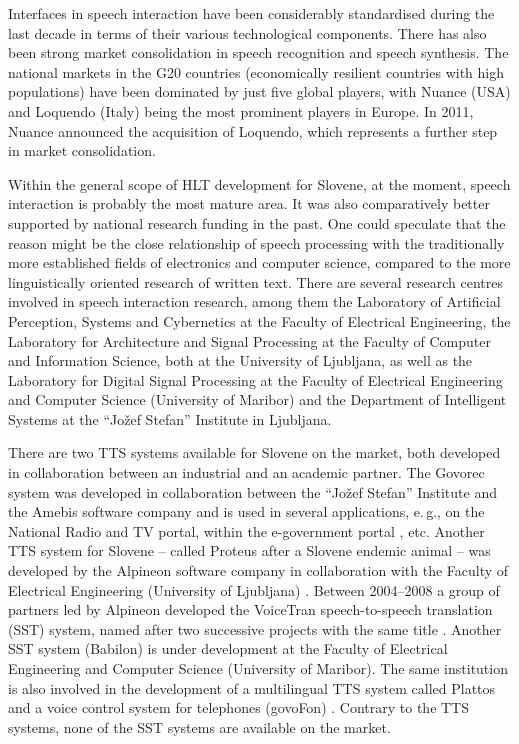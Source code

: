 \begin{multicols}{2}
Interfaces in speech interaction have been considerably standardised during the last decade in terms of their various technological components. There has also been strong market consolidation in speech recognition and speech synthesis. The national markets in the G20 countries (economically resilient countries with high populations) have been dominated by just five global players, with Nuance (USA) and Loquendo (Italy) being the most prominent players in Europe. In 2011, Nuance announced the acquisition of Loquendo, which represents a further step in market consolidation.

Within the general scope of HLT development for Slovene, at the moment, speech interaction is probably the most mature area. It was also comparatively better supported by national research funding in the past. One could speculate that the reason might be the close relationship of speech processing with the traditionally more established fields of electronics and computer science, compared to the more linguistically oriented research of written text. There are several research centres involved in speech interaction research, among them the Laboratory of Artificial Perception, Systems and Cybernetics at the Faculty of Electrical Engineering, the Laboratory for Architecture and Signal Processing at the Faculty of Computer and Information Science, both at the University of Ljub\-ljana, as well as the Laboratory for Digital Signal Processing at the Faculty of Electrical Engineering and Computer Science (University of Maribor) and the Department of Intelligent Systems at the “Jožef Stefan” Institute in Ljub\-ljana. 

There are two TTS systems available for Slovene on the market, both developed in collaboration between an industrial and an academic partner. The Govorec system was developed in collaboration between the “Jožef Stefan” Institute and the Amebis software company and is used in several applications, e.\,g., on the National Radio and TV portal, within the e-government portal \cite{Amb3}, etc.   Another TTS system for Slovene – called Proteus after a Slovene endemic animal – was developed by the Alpineon software company in collaboration with the Faculty of Electrical Engineering (University of Ljub\-ljana) \cite{Alp1}. Between 2004--2008 a group of partners led by Alpineon developed the VoiceTran speech-to-speech translation (SST) system, named after two successive projects with the same title \cite{Alp2}.  Another SST system (Babilon) is under development at the Faculty of Electrical Engineering and Computer Science (University of Maribor). The same institution is also involved in the development of a multilingual TTS system called Plattos and a voice control system for telephones (govoFon) \cite{Lab1}.  Contrary to the TTS systems, none of the SST systems are available on the market. 


\end{multicols}
